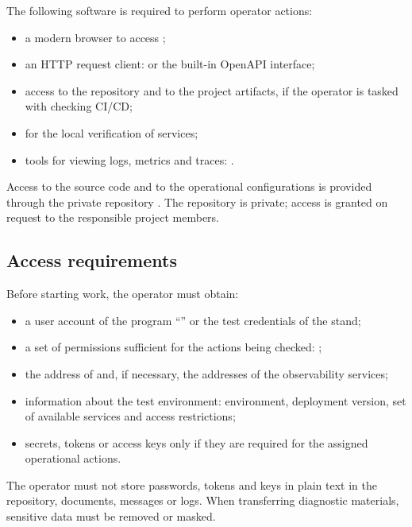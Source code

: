 \documentclass[12pt,a4paper]{extarticle}
\begin{document}
\begin{hseExample}
The following software is required to perform operator actions:

\begin{itemize}[leftmargin=1.25cm]
    \item a modern browser to access ;
    \item an HTTP request client:  or the built-in OpenAPI interface;
    \item access to the repository  and to the project artifacts, if the operator is tasked with checking CI/CD;
    \item {} for the local verification of services;
    \item tools for viewing logs, metrics and traces: .
\end{itemize}

Access to the source code and to the operational configurations is provided through the private repository . The repository is private; access is granted on request to the responsible project members.
\end{hseExample}

\subsection{Access requirements}

\begin{hseExample}
Before starting work, the operator must obtain:

\begin{itemize}[leftmargin=1.25cm]
    \item a user account of the program \enquote{\projectname} or the test credentials of the stand;
    \item a set of permissions sufficient for the actions being checked: ;
    \item the address of  and, if necessary, the addresses of the observability services;
    \item information about the test environment: environment, deployment version, set of available services and access restrictions;
    \item secrets, tokens or access keys only if they are required for the assigned operational actions.
\end{itemize}

The operator must not store passwords, tokens and keys in plain text in the repository, documents, messages or logs. When transferring diagnostic materials, sensitive data must be removed or masked.
\end{hseExample}
\end{document}
